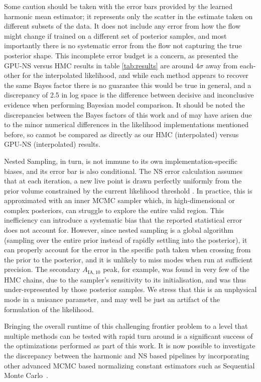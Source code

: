 \documentclass[twocolumn]{openjournal}
\begin{document}
Some caution should be taken with the error bars provided by the learned harmonic mean estimator; it represents only the scatter in the estimate taken on different subsets of the data. It does not include any error from how the flow might change if trained on a different set of posterior samples, and most importantly there is no systematic error from the flow not capturing the true posterior shape. This incomplete error budget is a concern, as presented the GPU-NS versus HMC results in table \ref{tab:results} are around $4\sigma$ away from each-other for the interpolated likelihood, and while each method appears to recover the same Bayes factor there is no guarantee this would be true in general, and a discrepancy of 2.5 in log space is the difference between decisive and inconclusive evidence when performing Bayesian model comparison. It should be noted the discrepancies between the Bayes factors of this work and of \cite{Piras_2024} may have arisen due to the minor numerical differences in the likelihood implementations mentioned before, so cannot be compared as directly as our HMC (interpolated) versus GPU-NS (interpolated) results.

Nested Sampling, in turn, is not immune to its own implementation-specific biases, and its error bar is also conditional. The NS error calculation assumes that at each iteration, a new live point is drawn perfectly uniformly from the prior volume constrained by the current likelihood threshold \citep{Skilling06}. In practice, this is approximated with an inner MCMC sampler which, in high-dimensional or complex posteriors, can struggle to explore the entire valid region. This inefficiency can introduce a systematic bias that the reported statistical error does not account for. However, since nested sampling is a global algorithm (sampling over the entire prior instead of rapidly settling into the posterior), it can properly account for the error in the specific path taken when crossing from the prior to the posterior, and it is unlikely to miss modes when run at sufficient precision. The secondary $A_{\text{IA},10}$ peak, for example, was found in very few of the HMC chains, due to the sampler's sensitivity to its initialisation, and was thus under-represented by those posterior samples. We stress that this is an unphysical mode in a nuisance parameter, and may well be just an artifact of the formulation of the likelihood.

Bringing the overall runtime of this challenging frontier problem to a level that multiple methods can be tested with rapid turn around is a significant success of the optimizations performed as part of this work. It is now possible to investigate the discrepancy between the harmonic and NS based pipelines by incorporating other advanced MCMC based normalizing constant estimators such as Sequential Monte Carlo~\citep{doucet_introduction_2001, chopin2020introduction}. 
\end{document}
